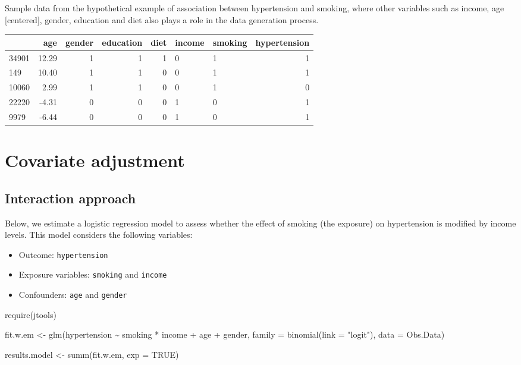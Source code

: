\documentclass[
  letterpaper,
  DIV=11,
  numbers=noendperiod]{scrreprt}
\newenvironment{Shaded}{\begin{snugshade}}{\end{snugshade}}
\newcommand{\AttributeTok}[1]{\textcolor[rgb]{0.40,0.45,0.13}{#1}}
\newcommand{\ConstantTok}[1]{\textcolor[rgb]{0.56,0.35,0.01}{#1}}
\newcommand{\FunctionTok}[1]{\textcolor[rgb]{0.28,0.35,0.67}{#1}}
\newcommand{\NormalTok}[1]{\textcolor[rgb]{0.00,0.23,0.31}{#1}}
\newcommand{\OtherTok}[1]{\textcolor[rgb]{0.00,0.23,0.31}{#1}}
\newcommand{\SpecialCharTok}[1]{\textcolor[rgb]{0.37,0.37,0.37}{#1}}
\newcommand{\StringTok}[1]{\textcolor[rgb]{0.13,0.47,0.30}{#1}}
\providecommand{\tightlist}{%
  \setlength{\itemsep}{0pt}\setlength{\parskip}{0pt}}\usepackage{longtable,booktabs,array}
\begin{document}
Sample data from the hypothetical example of association between
hypertension and smoking, where other variables such as income, age
{[}centered{]}, gender, education and diet also plays a role in the data
generation process.

\begin{table}[!h]
\centering
\begin{tabular}{lrrrrllr}
\toprule
  & age & gender & education & diet & income & smoking & hypertension\\
\midrule
34901 & 12.29 & 1 & 1 & 1 & 0 & 1 & 1\\
149 & 10.40 & 1 & 1 & 0 & 0 & 1 & 1\\
10060 & 2.99 & 1 & 1 & 0 & 0 & 1 & 0\\
22220 & -4.31 & 0 & 0 & 0 & 1 & 0 & 1\\
9979 & -6.44 & 0 & 0 & 0 & 1 & 0 & 1\\
\bottomrule
\end{tabular}
\end{table}

\hypertarget{covariate-adjustment}{%
\section{Covariate adjustment}\label{covariate-adjustment}}

\hypertarget{interaction-approach}{%
\subsection{Interaction approach}\label{interaction-approach}}

Below, we estimate a logistic regression model to assess whether the
effect of smoking (the exposure) on hypertension is modified by income
levels. This model considers the following variables:

\begin{itemize}
\tightlist
\item
  Outcome: \texttt{hypertension}
\item
  Exposure variables: \texttt{smoking} and \texttt{income}
\item
  Confounders: \texttt{age} and \texttt{gender}
\end{itemize}

\begin{Shaded}
\begin{Highlighting}[]
\FunctionTok{require}\NormalTok{(jtools)}

\NormalTok{fit.w.em }\OtherTok{\textless{}{-}} \FunctionTok{glm}\NormalTok{(hypertension }\SpecialCharTok{\textasciitilde{}}\NormalTok{ smoking }\SpecialCharTok{*}\NormalTok{ income }\SpecialCharTok{+}\NormalTok{ age }\SpecialCharTok{+}\NormalTok{ gender, }
                \AttributeTok{family =} \FunctionTok{binomial}\NormalTok{(}\AttributeTok{link =} \StringTok{"logit"}\NormalTok{), }
                \AttributeTok{data =}\NormalTok{ Obs.Data)}

\NormalTok{results.model }\OtherTok{\textless{}{-}} \FunctionTok{summ}\NormalTok{(fit.w.em, }\AttributeTok{exp =} \ConstantTok{TRUE}\NormalTok{)}
\end{Highlighting}
\end{Shaded}
\end{document}
